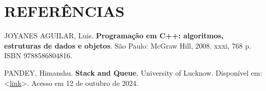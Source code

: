 \section{REFERÊNCIAS}

\noindent JOYANES AGUILAR, Luis. \textbf{Programação em C++: algoritmos, estruturas de dados e objetos}. São Paulo:
McGraw Hill, 2008. xxxi, 768 p. ISBN 9788586804816.

\vspace{2em} %

\noindent PANDEY, Himanshu. \textbf{Stack and Queue}. University of Lucknow. Disponível em: <\href{https://www.lkouniv.ac.in/site/writereaddata/siteContent/202003251324427324himanshu_Stack_Queue.pdf}{link}>. Acesso em 12 de outubro de 2024.